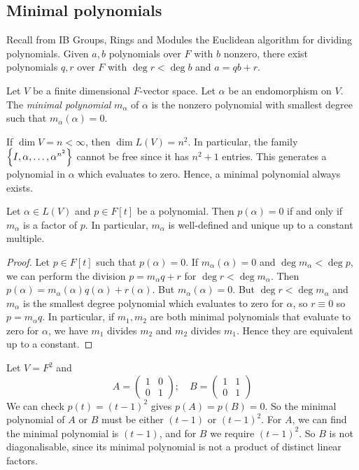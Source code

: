 \subsection{Minimal polynomials}
Recall from IB Groups, Rings and Modules the Euclidean algorithm for dividing polynomials.
Given \( a, b \) polynomials over \( F \) with \( b \) nonzero, there exist polynomials \( q, r \) over \( F \) with \( \deg r < \deg b \) and \( a = qb + r \).
\begin{definition}
	Let \( V \) be a finite dimensional \( F \)-vector space.
	Let \( \alpha \) be an endomorphism on \( V \).
	The \textit{minimal polynomial} \( m_\alpha \) of \( \alpha \) is the nonzero polynomial with smallest degree such that \( m_\alpha(\alpha) = 0 \).
\end{definition}
\begin{remark}
	If \( \dim V = n < \infty \), then \( \dim L(V) = n^2 \).
	In particular, the family \( \qty{I, \alpha, \dots, \alpha^{n^2}} \) cannot be free since it has \( n^2+1 \) entries.
	This generates a polynomial in \( \alpha \) which evaluates to zero.
	Hence, a minimal polynomial always exists.
\end{remark}
\begin{lemma}
	Let \( \alpha \in L(V) \) and \( p \in F[t] \) be a polynomial.
	Then \( p(\alpha) = 0 \) if and only if \( m_\alpha \) is a factor of \( p \).
	In particular, \( m_\alpha \) is well-defined and unique up to a constant multiple.
\end{lemma}
\begin{proof}
	Let \( p \in F[t] \) such that \( p(\alpha) = 0 \).
	If \( m_\alpha(\alpha) = 0 \) and \( \deg m_\alpha < \deg p \), we can perform the division \( p = m_\alpha q + r \) for \( \deg r < \deg m_\alpha \).
	Then \( p(\alpha) = m_\alpha(\alpha) q(\alpha) + r(\alpha) \).
	But \( m_\alpha(\alpha) = 0 \).
	But \( \deg r < \deg m_\alpha \) and \( m_\alpha \) is the smallest degree polynomial which evaluates to zero for \( \alpha \), so \( r \equiv 0 \) so \( p = m_\alpha q \).
	In particular, if \( m_1, m_2 \) are both minimal polynomials that evaluate to zero for \( \alpha \), we have \( m_1 \) divides \( m_2 \) and \( m_2 \) divides \( m_1 \).
	Hence they are equivalent up to a constant.
\end{proof}
\begin{example}
	Let \( V = F^2 \) and
	\[
		A= \begin{pmatrix}
			1 & 0 \\
			0 & 1
		\end{pmatrix};\quad B = \begin{pmatrix}
			1 & 1 \\
			0 & 1
		\end{pmatrix}
	\]
	We can check \( p(t) = (t-1)^2 \) gives \( p(A) = p(B) = 0 \).
	So the minimal polynomial of \( A \) or \( B \) must be either \( (t-1) \) or \( (t-1)^2 \).
	For \( A \), we can find the minimal polynomial is \( (t-1) \), and for \( B \) we require \( (t-1)^2 \).
	So \( B \) is not diagonalisable, since its minimal polynomial is not a product of distinct linear factors.
\end{example}

